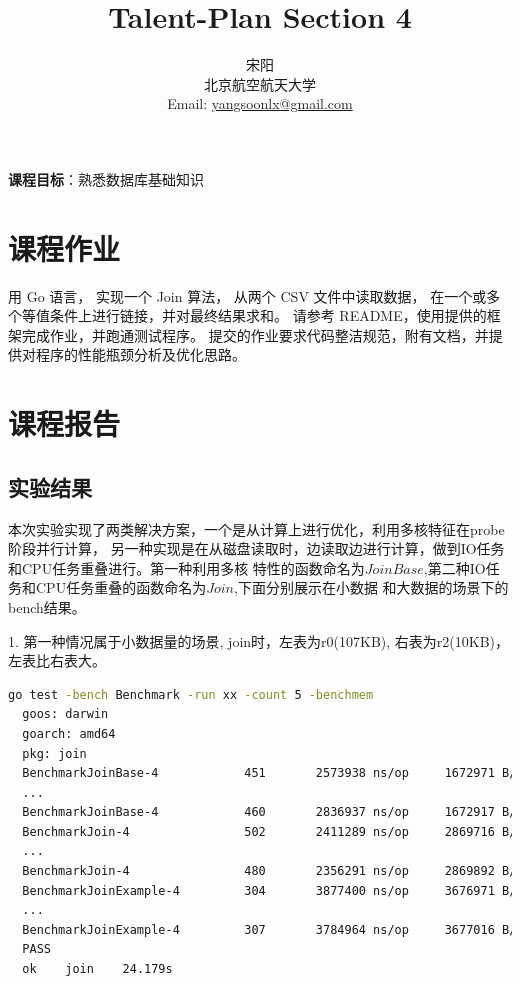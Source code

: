\documentclass[UTF8]{ctexart}
\title{\huge{\heiti Talent-Plan Section 4}}
\author{\small{\kaishu 宋阳}\\[2pt]
\small{\kaishu 北京航空航天大学}\\[2pt]
\small{Email:}
\url{yangsoonlx@gmail.com}
}
\date{} %
\begin{document}
\maketitle

\begin{flushleft}
\textbf{课程目标}：熟悉数据库基础知识 \\[8pt]
\end{flushleft}
\section{课程作业}\label{sec1}	
用 Go 语言， 实现一个 Join 算法， 从两个 CSV 文件中读取数据，
在一个或多个等值条件上进行链接，并对最终结果求和。
请参考 README，使用提供的框架完成作业，并跑通测试程序。
提交的作业要求代码整洁规范，附有文档，并提供对程序的性能瓶颈分析及优化思路。 \\

\section{课程报告}\label{sec2}

\subsection{实验结果}
本次实验实现了两类解决方案，一个是从计算上进行优化，利用多核特征在probe阶段并行计算，
另一种实现是在从磁盘读取时，边读取边进行计算，做到IO任务和CPU任务重叠进行。第一种利用多核
特性的函数命名为$JoinBase$,第二种IO任务和CPU任务重叠的函数命名为$Join$,下面分别展示在小数据
和大数据的场景下的bench结果。

1. 第一种情况属于小数据量的场景, join时，左表为r0(107KB), 右表为r2(10KB)，左表比右表大。
\begin{lstlisting}[language={bash}]
  go test -bench Benchmark -run xx -count 5 -benchmem
  goos: darwin
  goarch: amd64
  pkg: join
  BenchmarkJoinBase-4      	     451	   2573938 ns/op	 1672971 B/op	   21121 allocs/op
  ...
  BenchmarkJoinBase-4      	     460	   2836937 ns/op	 1672917 B/op	   21121 allocs/op
  BenchmarkJoin-4          	     502	   2411289 ns/op	 2869716 B/op	   21351 allocs/op
  ...
  BenchmarkJoin-4          	     480	   2356291 ns/op	 2869892 B/op	   21352 allocs/op
  BenchmarkJoinExample-4   	     304	   3877400 ns/op	 3676971 B/op	   21897 allocs/op
  ...
  BenchmarkJoinExample-4   	     307	   3784964 ns/op	 3677016 B/op	   21897 allocs/op
  PASS
  ok  	join	24.179s
\end{lstlisting}
\end{document}
